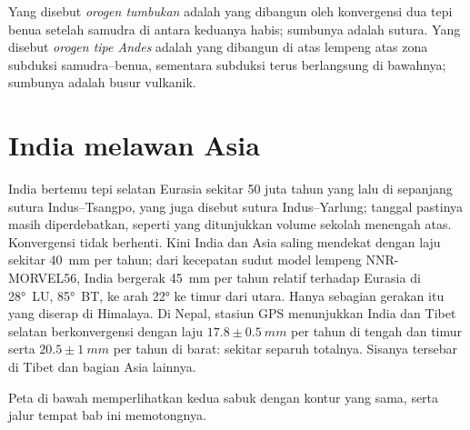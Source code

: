 \begin{definition}\label{def:b2:himalaya-andes:types}
Yang disebut \emph{orogen tumbukan} adalah  yang dibangun oleh konvergensi
dua tepi benua setelah samudra di antara keduanya habis; sumbunya adalah sutura.
Yang disebut \emph{orogen tipe Andes} adalah  yang dibangun di atas lempeng
atas zona subduksi samudra--benua, sementara subduksi terus berlangsung di bawahnya; sumbunya
adalah busur vulkanik.
\end{definition}


\section{India melawan Asia}\label{sec:b2:himalaya-andes:himalaya}

India bertemu tepi selatan Eurasia sekitar 50 juta tahun yang lalu di sepanjang sutura Indus--Tsangpo,
yang juga disebut sutura Indus--Yarlung; tanggal pastinya masih diperdebatkan, seperti yang
ditunjukkan volume sekolah menengah atas. Konvergensi tidak berhenti. Kini India dan Asia saling mendekat
dengan laju sekitar \qty{40}{mm} per tahun; dari kecepatan sudut model lempeng NNR-MORVEL56,
India bergerak \qty{45}{mm} per tahun relatif terhadap Eurasia di \ang{28}~LU, \ang{85}~BT, ke arah
\ang{22} ke timur dari utara. Hanya sebagian gerakan itu yang diserap di Himalaya. Di Nepal,
stasiun GPS menunjukkan India dan Tibet selatan berkonvergensi dengan laju $17.8 \pm \qty{0.5}{mm}$ per tahun di
tengah dan timur serta $20.5 \pm \qty{1}{mm}$ per tahun di barat: sekitar separuh totalnya. Sisanya
tersebar di Tibet dan bagian Asia lainnya.

Peta di bawah memperlihatkan kedua sabuk dengan kontur yang sama, serta jalur tempat
bab ini memotongnya.

